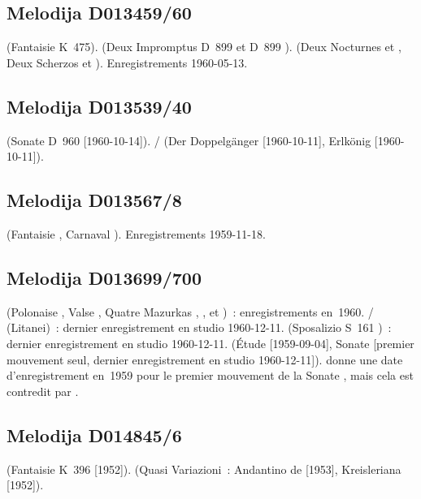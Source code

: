 \subsection{Melodija D013459/60}

\Mozart{} (Fantaisie K~475).
\Schubert{} (Deux Impromptus D~899  et D~899 ).
\Chopin{} (Deux Nocturnes   et  , Deux
Scherzos  et ).
Enregistrements 1960-05-13.

\subsection{Melodija D013539/40}

\Schubert{} (Sonate D~960 [1960-10-14]).
\Schubert{}/\Liszt{} (Der Doppelgänger [1960-10-11], Erlkönig [1960-10-11]).

\subsection{Melodija D013567/8}

\Schumann{} (Fantaisie , Carnaval ).
Enregistrements 1959-11-18.

\subsection{Melodija D013699/700}

\Chopin{} (Polonaise  , Valse  ,
Quatre Mazurkas  ,  , 
 et  )~: enregistrements en~1960.
\Schubert{}/\Liszt{} (Litanei)~: dernier enregistrement en studio
1960-12-11.
\Liszt{} (Sposalizio S~161 )~: dernier enregistrement en studio
1960-12-11.
\Scriabine{} (Étude   [1959-09-04], Sonate 
[premier mouvement seul, dernier enregistrement en studio 1960-12-11]).
\INikonovich{} \citep[voir][p.~3]{Nikonovich11} donne une date
d'enregistrement en~1959 pour le premier mouvement de la Sonate ,
mais cela est contredit par \FMalik{} \citep[voir][p.~76]{Malik}.

\subsection{Melodija D014845/6}

\Mozart{} (Fantaisie K~396 [1952]).
\Schumann{} (Quasi Variazioni~: Andantino de \CWieck{} 
[1953], Kreisleriana  [1952]).

